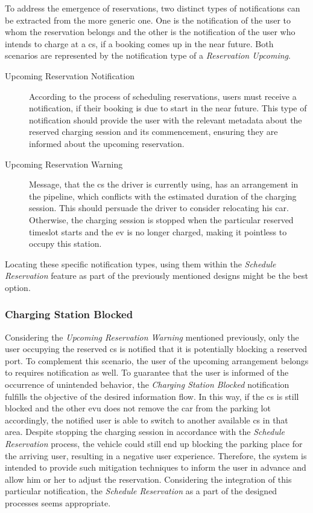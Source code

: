 To address the emergence of reservations, two distinct types of notifications can be extracted from the more generic one. One is the notification of the user to whom the reservation belongs and the other is the notification of the user who intends to charge at a \acrshort{cs}, if a booking comes up in the near future. 
Both scenarios are represented by the notification type of a \textit{Reservation Upcoming}.

\begin{description}
    \item[Upcoming Reservation Notification] According to the process of scheduling reservations, users must receive a notification, if their booking is due to start in the near future. 
    This type of notification should provide the user with the relevant metadata about the reserved charging session and its commencement, ensuring they are informed about the upcoming reservation.
    \item[Upcoming Reservation Warning] Message, that the \acrshort{cs} the driver is currently using, has an arrangement in the pipeline, which conflicts with the estimated duration of the charging session. This should persuade the driver to consider relocating his car. 
    Otherwise, the charging session is stopped when the particular reserved timeslot starts and the \acrshort{ev} is no longer charged, making it pointless to occupy this station.
\end{description}

\noindent Locating these specific notification types, using them within the \textit{Schedule Reservation} feature as part of the previously mentioned designs might be the best option.

\subsubsection{Charging Station Blocked}
\label{ch:Design:sec:Reservation System:ssec:Notification Capabilities:sssec:Charging Station Blocked}

Considering the \textit{Upcoming Reservation Warning} mentioned previously, only the user occupying the reserved \acrshort{cs} is notified that it is potentially blocking a reserved port. To complement this scenario, the user of the upcoming arrangement belongs to requires notification as well.
To guarantee that the user is informed of the occurrence of unintended behavior, the \textit{Charging Station Blocked} notification fulfills the objective of the desired information flow. In this way, if the \acrshort{cs} is still blocked and the other \acrshort{evu} does not remove the car from the parking lot accordingly, the notified user is able to switch to another available \acrshort{cs} in that area.
Despite stopping the charging session in accordance with the \textit{Schedule Reservation} process, the vehicle could still end up blocking the parking place for the arriving user, resulting in a negative user experience. Therefore, the system is intended to provide such mitigation techniques to inform the user in advance and allow him or her to adjust the reservation.
Considering the integration of this particular notification, the \textit{Schedule Reservation} as a part of the designed processes seems appropriate.

